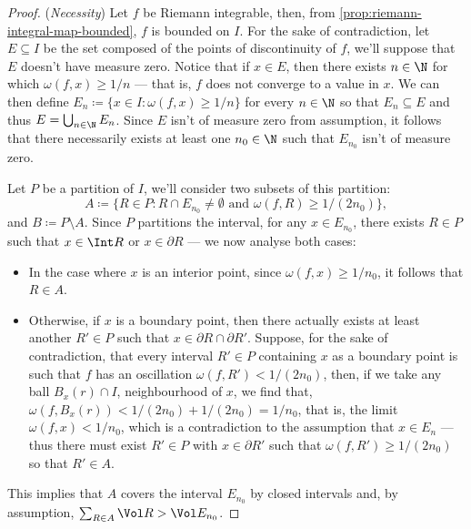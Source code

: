 \begin{proof}
(\emph{Necessity}) Let \(f\) be Riemann integrable, then, from
\cref{prop:riemann-integral-map-bounded}, \(f\) is bounded on \(I\). For the
sake of contradiction, let \(E \subseteq I\) be the set composed of the points
of discontinuity of \(f\), we'll suppose that \(E\) doesn't have measure
zero. Notice that if \(x \in E\), then there exists \(n \in \N\) for which
\(\omega(f, x) \geq 1/n\) --- that is, \(f\) does not converge to a value in
\(x\). We can then define \(E_n \coloneq \{x \in I \colon \omega(f, x) \geq 1/n\}\)
for every \(n \in \N\) so that \(E_n \subseteq E\) and thus \(E = \bigcup_{n \in
\N} E_n\). Since \(E\) isn't of measure zero from assumption, it follows that
there necessarily exists at least one \(n_0 \in \N\) such that \(E_{n_0}\) isn't
of measure zero.

Let \(P\) be a partition of \(I\), we'll consider two subsets of this partition:
\[
  A \coloneq \{R \in P \colon R \cap E_{n_{0}} \neq \emptyset
  \text{ and } \omega(f, R) \geq 1/(2n_0)\},
\]
and \(B \coloneq P \setminus A\). Since \(P\) partitions the interval, for any
\(x \in E_{n_0}\), there exists \(R \in P\) such that \(x \in \Int R\) or \(x
\in \partial R\) --- we now analyse both cases:
\begin{itemize}\setlength\itemsep{0em}
\item In the case where \(x\) is an interior point, since \(\omega(f, x) \geq
  1/n_0\), it follows that \(R \in A\).
\item Otherwise, if \(x\) is a boundary point, then there actually exists at
  least another \(R' \in P\) such that \(x \in \partial R \cap \partial
  R'\). Suppose, for the sake of contradiction, that every interval \(R' \in P\)
  containing \(x\) as a boundary point is such that \(f\) has an oscillation
  \(\omega(f, R') < 1/(2n_0)\), then, if we take any ball \(B_x(r) \cap I\),
  neighbourhood of \(x\), we find that, \(\omega(f, B_x(r)) < 1/(2n_0) +
  1/(2n_0) = 1/n_0\), that is, the limit \(\omega(f, x) < 1/n_0\), which is a
  contradiction to the assumption that \(x \in E_n\) --- thus there must exist
  \(R' \in P\) with \(x \in \partial R'\) such that \(\omega(f, R') \geq
  1/(2n_0)\) so that \(R' \in A\).
\end{itemize}
This implies that \(A\) covers the interval \(E_{n_0}\) by closed intervals and,
by assumption, \(\sum_{R \in A} \Vol R > \Vol E_{n_0}\).


\end{proof}
